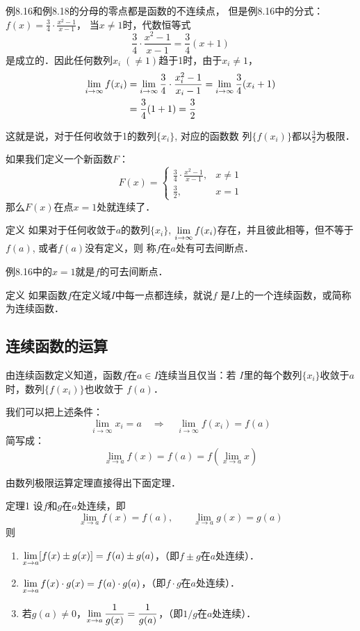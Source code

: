 \begin{rmk}
例8.16和例8.18的分母的零点都是函数的不连续点，
但是例8.16中的分式：$f(x)=\frac{3}{4}\cdot\frac{x^2-1}{x-1}$，
当$x\ne 1$时，代数恒等式
\[\frac{3}{4}\cdot\frac{x^2-1}{x-1}=\frac{3}{4}(x+1)\]
是成立的．因此任何数列$x_i\; (\ne 1)$趋于1时，由于$x_i\ne 1$，
\[\begin{split}
    \displaystyle\lim_{i\to\infty}f(x_i)&=\displaystyle\lim_{i\to\infty}\dfrac{3}{4}\cdot \dfrac{x^2_i-1}{x_i-1}=\displaystyle\lim_{i\to\infty}\dfrac{3}{4}(x_i+1)\\
    &=\dfrac{3}{4}(1+1)=\dfrac{3}{2}
\end{split}\]

这就是说，对于任何收敛于1的数列$\{x_i\}$, 对应的函数数
列$\{f(x_i)\}$都以$\frac{3}{2}$为极限． 

如果我们定义一个新函数$F$：
\[F(x)=\begin{cases}
    \frac{3}{4}\cdot\frac{x^2-1}{x-1},& x\ne 1\\
    \frac{3}{2}, & x=1
\end{cases}\]
那么$F(x)$在点$x=1$处就连续了．
\end{rmk}

\begin{blk}{定义}
     如果对于任何收敛于$a$的数列$\{x_i\}$, $\displaystyle\lim_{i\to\infty}f(x_i)$存在，并且彼此相等，但不等于$f(a)$, 或者$f(a)$没有定义，则
称$f$在$a$处有可去间断点．
\end{blk}

例8.16中的$x=1$就是$f$的可去间断点．

\begin{blk}{定义}
    如果函数$f$在定义域$I$中每一点都连续，就说$f$
是$I$上的一个连续函数，或简称为连续函数．
\end{blk}

\subsection{连续函数的运算}
由连续函数定义知道，函数$f$在$a\in I$连续当且仅当：若
$I$里的每个数列$\{x_i\}$收敛于$a$时，数列$\{f(x_i)\}$也收敛于
$f(a)$．

我们可以把上述条件：
\[\lim_{i\to \infty}x_i=a \quad \Longrightarrow\quad \lim_{i\to \infty}f(x_i)=f(a)\]
简写成：
\[\lim_{x\to a}f(x)=f(a)=f\left(\lim_{x\to a}x\right)\]

由数列极限运算定理直接得出下面定理．

\begin{blk}{定理1}
    设$f$和$g$在$a$处连续，即
    \[\lim_{x\to a}f(x)=f(a),\qquad \lim_{x\to a}g(x)=g(a)\]
    则
\begin{enumerate}
    \item $\displaystyle\lim_{x\to a}[f(x)\pm g(x)]=f(a)\pm g(a)$，（即$f\pm g$在$a$处连续）．
    \item $\displaystyle\lim_{x\to a}f(x)\cdot g(x)=f(a)\cdot g(a)$，（即$f\cdot g$在$a$处连续）．
    \item 若$g(a)\ne 0$，$\displaystyle\lim_{x\to a}\dfrac{1}{g(x)}=\dfrac{1}{g(a)}$，（即$1/g$在$a$处连续）．
\end{enumerate}
\end{blk}

